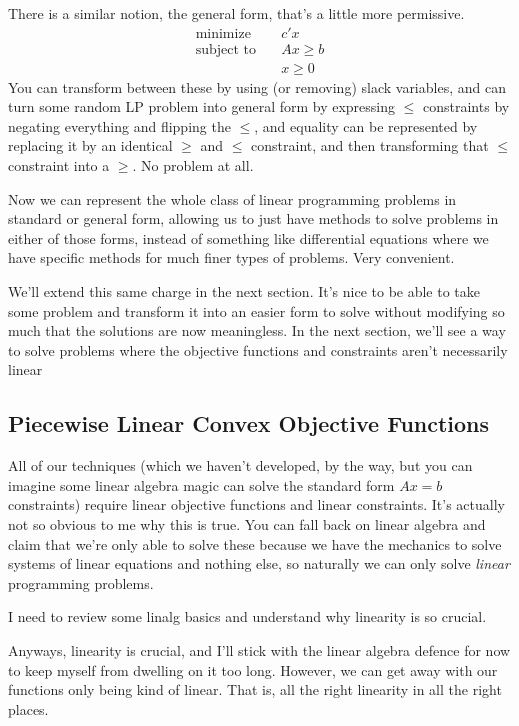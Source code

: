 \documentclass[12pt, letterpaper]{article}
\begin{document}
There is a similar notion, the general form, that's a little more permissive.
\begin{align*}
    \text{minimize} \quad &c'x \\
    \text{subject to} \quad &Ax \geq b \\
                      &  x\geq 0
\end{align*}
You can transform between these by using (or removing) slack variables,
and can turn some random LP problem into general form by expressing $\leq$ constraints
by negating everything and flipping the $\leq$, 
and equality can be represented by replacing it by an identical $\geq$ and $\leq$ constraint,
and then transforming that $\leq$ constraint into a $\geq$. No problem at all.

Now we can represent the whole class of linear programming problems in standard or general form,
allowing us to just have methods to solve problems in either of those forms,
instead of something like differential equations where we have specific
methods for much finer types of problems. Very convenient.

We'll extend this same charge in the next section. It's nice to be able
to take some problem and transform it into an easier form to solve
without modifying so much that the solutions are now meaningless.
In the next section, we'll see a way to solve problems
where the objective functions and constraints aren't
necessarily linear

\subsection{Piecewise Linear Convex Objective Functions}

All of our techniques (which we haven't developed, by the way, but you can imagine some linear algebra
magic can solve the standard form $Ax = b$ constraints)
require linear objective functions and linear constraints.
It's actually not so obvious to me why this is true.
You can fall back on linear algebra and claim that we're
only able to solve these because we have the mechanics to solve
systems of linear equations and nothing else, so naturally
we can only solve \emph{linear} programming problems.

I need to review some linalg basics and understand why
linearity is so crucial.

Anyways, linearity is crucial, and I'll stick with the linear algebra defence
for now to keep myself from dwelling on it too long. 
However, we can get away with our functions only being kind of linear.
That is, all the right linearity in all the right places.
\end{document}
